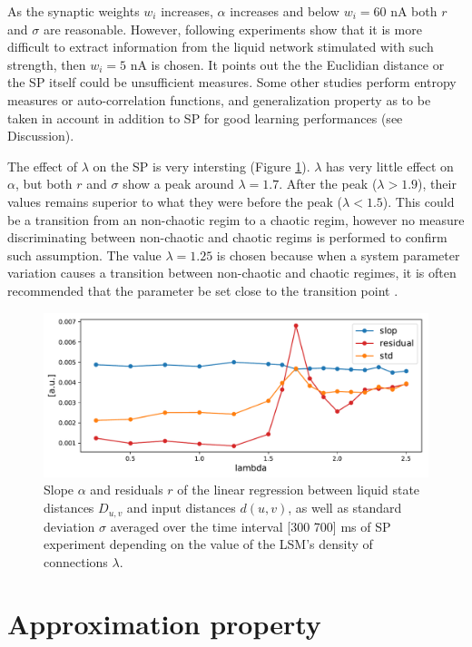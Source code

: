 \documentclass[11pt, a4paper]{article} %
\begin{document}
As the synaptic weights $w_i$ increases, $\alpha$ increases and below $w_i = 60$ nA both $r$ and $\sigma$ are reasonable. However, following experiments show that it is more difficult to extract information from the liquid network stimulated with such strength, then $w_i = 5$ nA is chosen. It points out the the Euclidian distance or the SP itself could be unsufficient measures. Some other studies perform entropy measures or auto-correlation functions, and generalization property as to be taken in account in addition to SP for good learning performances (see Discussion). 

The effect of $\lambda$ on the SP is very intersting (Figure \ref{SPlambda}). $\lambda$ has very little effect on $\alpha$, but both $r$ and $\sigma$ show a peak around $\lambda = 1.7$. After the peak ($\lambda > 1.9$), their values remains superior to what they were before the peak ($\lambda < 1.5$). This could be a transition from an non-chaotic regim to a chaotic regim, however no measure discriminating between non-chaotic and chaotic regims is performed to confirm such assumption. The value $\lambda = 1.25$ is chosen because when a system parameter variation causes a transition between non-chaotic and chaotic regimes, it is often recommended that the parameter be set close to the transition point \cite{bertschinger2004real, legenstein2007edge}.

\begin{figure}
\centering
\includegraphics[scale=.7]{figures/SP_lambda.pdf}
\caption{Slope $\alpha$ and residuals $r$ of the linear regression between liquid state distances $D_{u,v}$ and input distances $d(u,v)$, as well as standard deviation $\sigma$ averaged over the time interval [300 700] ms of SP experiment depending on the value of the LSM's density of connections $\lambda$.}
\label{SPlambda}
\end{figure}

\section{Approximation property}
\end{document}
